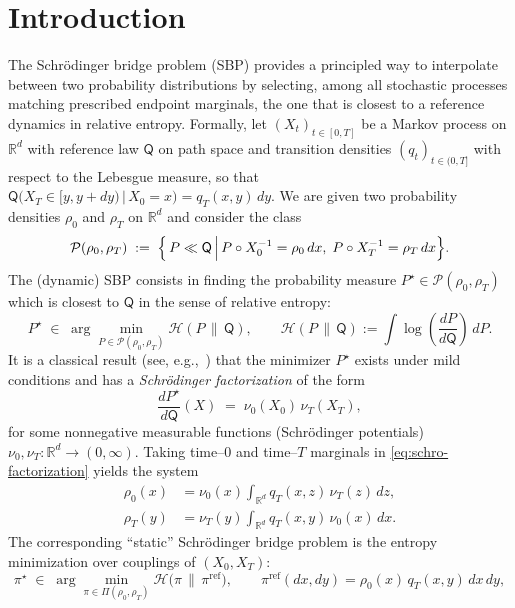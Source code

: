 \documentclass[11pt]{article}
\theoremstyle{remark}
\numberwithin{equation}{section}
\newcommand{\R}{\mathbb{R}}
\def\RefLaw{\mathsf{Q}}
\begin{document}
\section{Introduction}
The Schr\"odinger bridge problem (SBP) provides a principled way to interpolate between two probability distributions by selecting, among all stochastic processes matching prescribed endpoint marginals, the one that is closest to a reference dynamics in relative entropy. Formally, let $(X_t)_{t\in[0,T]}$ be a Markov process on $\mathbb{R}^d$ with reference law
$\RefLaw$ on path space and transition densities $(q_t)_{t\in(0,T]}$ with respect to the Lebesgue measure, so that
$
\RefLaw\bigl(X_T \in [y, y + dy) \,\big|\, X_0 = x\bigr)
= q_T(x,y)\,dy$. 
We are given two probability densities $\rho_0$ and $\rho_T$ on $\R^d$
and consider the class
\[
\mathcal{P}(\rho_0,\rho_T)
\;:=\;
\Bigl\{\, P \ll \RefLaw \,\Big|\,
        P\circ X_0^{-1} = \rho_0\,dx,\;
        P\circ X_T^{-1} = \rho_T\,dx
\Bigr\}.
\]
The (dynamic) SBP consists in finding the
probability measure $P^\star\in\mathcal{P}(\rho_0,\rho_T)$ which is closest
to $\RefLaw$ in the sense of relative entropy:
\begin{equation}\label{eq:SBP-dynamic}
  P^\star
  \;\in\;
  \arg\min_{P\in\mathcal{P}(\rho_0,\rho_T)}
  \mathcal{H}(P\,\|\,\RefLaw),
  \qquad
  \mathcal{H}(P\,\|\,\RefLaw)
  := \int \log\!\left(\frac{dP}{d\RefLaw}\right)\,dP.
\end{equation}
It is a classical result (see, e.g.,~\cite{ChenGeorgiouPavon2016}) that the minimizer $P^\star$
exists under mild conditions and has a {\em Schr\"odinger factorization} of the form
\begin{equation}\label{eq:schro-factorization}
  \frac{dP^\star}{d\RefLaw}(X)
  \;=\;
  \nu_0(X_0)\,\nu_T(X_T),
\end{equation}
for some nonnegative measurable functions (Schr\"odinger potentials)
$\nu_0,\nu_T : \mathbb{R}^d \to (0,\infty)$.
Taking time--$0$ and time--$T$ marginals in \eqref{eq:schro-factorization} yields
the system
\begin{align}
  \rho_0(x)
  &= \nu_0(x)\int_{\mathbb{R}^d} q_T(x,z)\,\nu_T(z)\,dz,
  \label{eq:schro-system-0}
  \\
  \rho_T(y)
  &= \nu_T(y)\int_{\mathbb{R}^d} q_T(x,y)\,\nu_0(x)\,dx.
  \label{eq:schro-system-T}
\end{align}
The corresponding ``static'' Schr\"odinger bridge problem is the entropy minimization
over couplings of $(X_0,X_T)$:
\begin{equation}\label{eq:SBP-static}
  \pi^\star \;\in\;
  \arg\min_{\pi\in\Pi(\rho_0,\rho_T)}
  \mathcal{H}\bigl(\pi \,\|\, \pi^{\mathrm{ref}}\bigr),
  \qquad
  \pi^{\mathrm{ref}}(dx,dy)
   = \rho_0(x)\,q_T(x,y)\,dx\,dy,
\end{equation}
\end{document}
